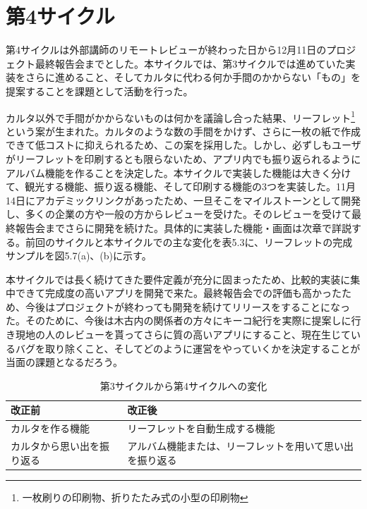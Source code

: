 \section{第4サイクル}
第4サイクルは外部講師のリモートレビューが終わった日から12月11日のプロジェクト最終報告会までとした。本サイクルでは、第3サイクルでは進めていた実装をさらに進めること、そしてカルタに代わる何か手間のかからない「もの」を提案することを課題として活動を行った。
\par カルタ以外で手間がかからないものは何かを議論し合った結果、リーフレット\footnote{一枚刷りの印刷物、折りたたみ式の小型の印刷物}という案が生まれた。カルタのような数の手間をかけず、さらに一枚の紙で作成できて低コストに抑えられるため、この案を採用した。しかし、必ずしもユーザがリーフレットを印刷するとも限らないため、アプリ内でも振り返られるようにアルバム機能を作ることを決定した。本サイクルで実装した機能は大きく分けて、観光する機能、振り返る機能、そして印刷する機能の3つを実装した。11月14日にアカデミックリンクがあったため、一旦そこをマイルストーンとして開発し、多くの企業の方や一般の方からレビューを受けた。そのレビューを受けて最終報告会までさらに開発を続けた。具体的に実装した機能・画面は次章で詳説する。前回のサイクルと本サイクルでの主な変化を表5.3に、リーフレットの完成サンプルを図5.7(a)、(b)に示す。
\par 本サイクルでは長く続けてきた要件定義が充分に固まったため、比較的実装に集中できて完成度の高いアプリを開発で来た。最終報告会での評価も高かったため、今後はプロジェクトが終わっても開発を続けてリリースをすることになった。そのために、今後は木古内の関係者の方々にキーコ紀行を実際に提案しに行き現地の人のレビューを貰ってさらに質の高いアプリにすること、現在生じているバグを取り除くこと、そしてどのように運営をやっていくかを決定することが当面の課題となるだろう。

\begin{table}[htb]
\centering
\addtocounter{table}{+0}
\caption{第3サイクルから第4サイクルへの変化}
  \begin{tabular}{|l|l|} \hline
    改正前&改正後  \\ \hline 
    カルタを作る機能 & \parbox{20zw}{リーフレットを自動生成する機能} \\  \hline
    カルタから思い出を振り返る &\parbox{20zw}{アルバム機能または、リーフレットを用いて思い出を振り返る}\\ \hline
  \end{tabular} 
\end{table}

